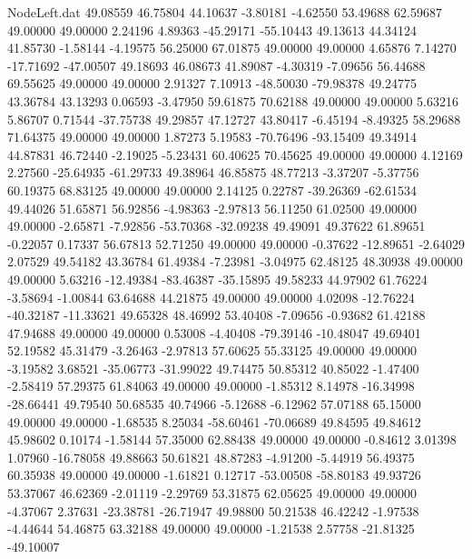 \begin{filecontents}{NodeLeft.dat}
  49.08559   46.75804   44.10637    -3.80181   -4.62550   53.49688   62.59687   49.00000   49.00000    2.24196    4.89363  -45.29171  -55.10443
  49.13613   44.34124   41.85730    -1.58144   -4.19575   56.25000   67.01875   49.00000   49.00000    4.65876    7.14270  -17.71692  -47.00507
  49.18693   46.08673   41.89087    -4.30319   -7.09656   56.44688   69.55625   49.00000   49.00000    2.91327    7.10913  -48.50030  -79.98378
  49.24775   43.36784   43.13293     0.06593   -3.47950   59.61875   70.62188   49.00000   49.00000    5.63216    5.86707    0.71544  -37.75738
  49.29857   47.12727   43.80417    -6.45194   -8.49325   58.29688   71.64375   49.00000   49.00000    1.87273    5.19583  -70.76496  -93.15409
  49.34914   44.87831   46.72440    -2.19025   -5.23431   60.40625   70.45625   49.00000   49.00000    4.12169    2.27560  -25.64935  -61.29733
  49.38964   46.85875   48.77213    -3.37207   -5.37756   60.19375   68.83125   49.00000   49.00000    2.14125    0.22787  -39.26369  -62.61534
  49.44026   51.65871   56.92856    -4.98363   -2.97813   56.11250   61.02500   49.00000   49.00000   -2.65871   -7.92856  -53.70368  -32.09238
  49.49091   49.37622   61.89651    -0.22057    0.17337   56.67813   52.71250   49.00000   49.00000   -0.37622  -12.89651   -2.64029    2.07529
  49.54182   43.36784   61.49384    -7.23981   -3.04975   62.48125   48.30938   49.00000   49.00000    5.63216  -12.49384  -83.46387  -35.15895
  49.58233   44.97902   61.76224    -3.58694   -1.00844   63.64688   44.21875   49.00000   49.00000    4.02098  -12.76224  -40.32187  -11.33621
  49.65328   48.46992   53.40408    -7.09656   -0.93682   61.42188   47.94688   49.00000   49.00000    0.53008   -4.40408  -79.39146  -10.48047
  49.69401   52.19582   45.31479    -3.26463   -2.97813   57.60625   55.33125   49.00000   49.00000   -3.19582    3.68521  -35.06773  -31.99022
  49.74475   50.85312   40.85022    -1.47400   -2.58419   57.29375   61.84063   49.00000   49.00000   -1.85312    8.14978  -16.34998  -28.66441
  49.79540   50.68535   40.74966    -5.12688   -6.12962   57.07188   65.15000   49.00000   49.00000   -1.68535    8.25034  -58.60461  -70.06689
  49.84595   49.84612   45.98602     0.10174   -1.58144   57.35000   62.88438   49.00000   49.00000   -0.84612    3.01398    1.07960  -16.78058
  49.88663   50.61821   48.87283    -4.91200   -5.44919   56.49375   60.35938   49.00000   49.00000   -1.61821    0.12717  -53.00508  -58.80183
  49.93726   53.37067   46.62369    -2.01119   -2.29769   53.31875   62.05625   49.00000   49.00000   -4.37067    2.37631  -23.38781  -26.71947
  49.98800   50.21538   46.42242    -1.97538   -4.44644   54.46875   63.32188   49.00000   49.00000   -1.21538    2.57758  -21.81325  -49.10007

\end{filecontents}
